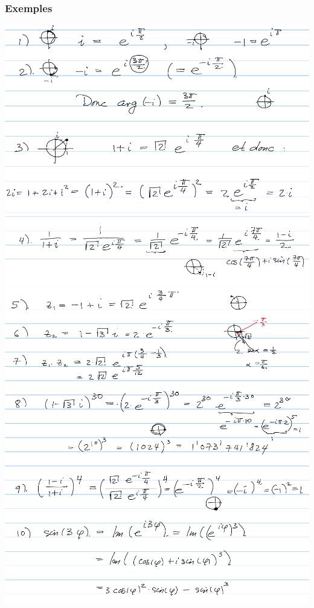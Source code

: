 \documentclass[12pt,a4paper]{article}
\begin{document}
{\subsubsection{Exemples}
\includegraphics[scale=0.5]{illustrations_Analyse/exemples_1_3}\\
\includegraphics[scale=0.60]{illustrations_Analyse/exemple_4}\\
\includegraphics[scale=0.60]{illustrations_Analyse/exemples_5_10}

}
\end{document}
